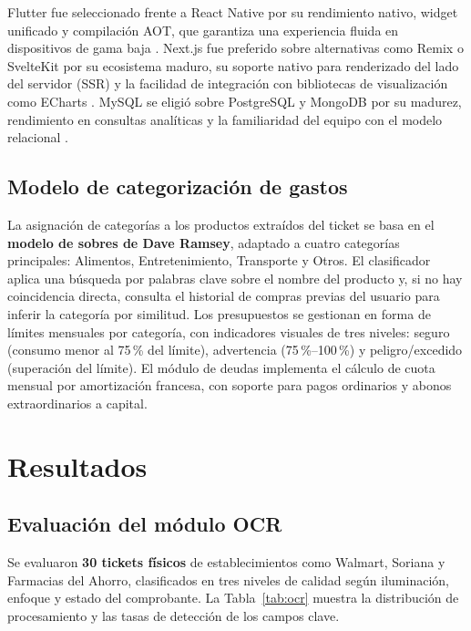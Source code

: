 \documentclass[10pt,twocolumn,letterpaper]{article}
\begin{document}
Flutter fue seleccionado frente a React Native por su rendimiento nativo, widget unificado y
compilación AOT, que garantiza una experiencia fluida en dispositivos de gama baja \cite{WhyFlutter}.
Next.js fue preferido sobre alternativas como Remix o SvelteKit por su ecosistema maduro, su
soporte nativo para renderizado del lado del servidor (SSR) y la facilidad de integración con
bibliotecas de visualización como ECharts \cite{NextJSOfficial}. MySQL se eligió sobre PostgreSQL
y MongoDB por su madurez, rendimiento en consultas analíticas y la familiaridad del equipo con el
modelo relacional \cite{WhyMySQL}.

\subsection{Modelo de categorización de gastos}

La asignación de categorías a los productos extraídos del ticket se basa en el
\textbf{modelo de sobres de Dave Ramsey}, adaptado a cuatro categorías principales: Alimentos,
Entretenimiento, Transporte y Otros. El clasificador aplica una búsqueda por palabras clave sobre
el nombre del producto y, si no hay coincidencia directa, consulta el historial de compras previas
del usuario para inferir la categoría por similitud. Los presupuestos se gestionan en forma de
límites mensuales por categoría, con indicadores visuales de tres niveles: seguro (consumo menor
al 75\,\% del límite), advertencia (75\,\%--100\,\%) y peligro/excedido (superación del límite).
El módulo de deudas implementa el cálculo de cuota mensual por amortización francesa, con soporte
para pagos ordinarios y abonos extraordinarios a capital.


\section{Resultados}

\subsection{Evaluación del módulo OCR}

Se evaluaron \textbf{30 tickets físicos} de establecimientos como Walmart, Soriana y Farmacias del
Ahorro, clasificados en tres niveles de calidad según iluminación, enfoque y estado del
comprobante. La Tabla~\ref{tab:ocr} muestra la distribución de procesamiento y las tasas de
detección de los campos clave.
\end{document}
